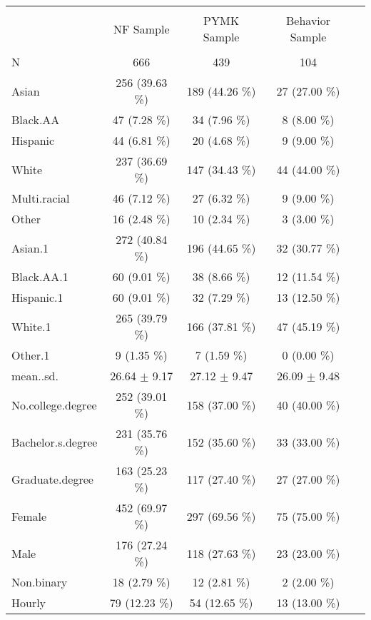 
\begin{table}[!htbp] \centering 
  \caption{} 
  \label{tab:usersumstats} 
\begin{tabular}{@{\extracolsep{5pt}} lcccc} 
\\[-1.8ex]\hline 
\hline \\[-1.8ex] 
 & NF Sample & PYMK Sample & Behavior Sample \\ 
\hline \\[-1.8ex] 
N & 666 & 439 & 104 \\ 
Asian & 256 (39.63 \%) & 189 (44.26 \%) & 27 (27.00 \%) \\ 
Black.AA & 47 (7.28 \%) & 34 (7.96 \%) & 8 (8.00 \%) \\ 
Hispanic & 44 (6.81 \%) & 20 (4.68 \%) & 9 (9.00 \%) \\ 
White & 237 (36.69 \%) & 147 (34.43 \%) & 44 (44.00 \%) \\ 
Multi.racial & 46 (7.12 \%) & 27 (6.32 \%) & 9 (9.00 \%) \\ 
Other & 16 (2.48 \%) & 10 (2.34 \%) & 3 (3.00 \%) \\ 
Asian.1 & 272 (40.84 \%) & 196 (44.65 \%) & 32 (30.77 \%) \\ 
Black.AA.1 & 60 (9.01 \%) & 38 (8.66 \%) & 12 (11.54 \%) \\ 
Hispanic.1 & 60 (9.01 \%) & 32 (7.29 \%) & 13 (12.50 \%) \\ 
White.1 & 265 (39.79 \%) & 166 (37.81 \%) & 47 (45.19 \%) \\ 
Other.1 & 9 (1.35 \%) & 7 (1.59 \%) & 0 (0.00 \%) \\ 
mean..sd. & 26.64 $\pm$ 9.17 & 27.12 $\pm$ 9.47 & 26.09 $\pm$ 9.48 \\ 
No.college.degree & 252 (39.01 \%) & 158 (37.00 \%) & 40 (40.00 \%) \\ 
Bachelor.s.degree & 231 (35.76 \%) & 152 (35.60 \%) & 33 (33.00 \%) \\ 
Graduate.degree & 163 (25.23 \%) & 117 (27.40 \%) & 27 (27.00 \%) \\ 
Female & 452 (69.97 \%) & 297 (69.56 \%) & 75 (75.00 \%) \\ 
Male & 176 (27.24 \%) & 118 (27.63 \%) & 23 (23.00 \%) \\ 
Non.binary & 18 (2.79 \%) & 12 (2.81 \%) & 2 (2.00 \%) \\ 
Hourly & 79 (12.23 \%) & 54 (12.65 \%) & 13 (13.00 \%) \\ 

\end{tabular}
\end{table}
